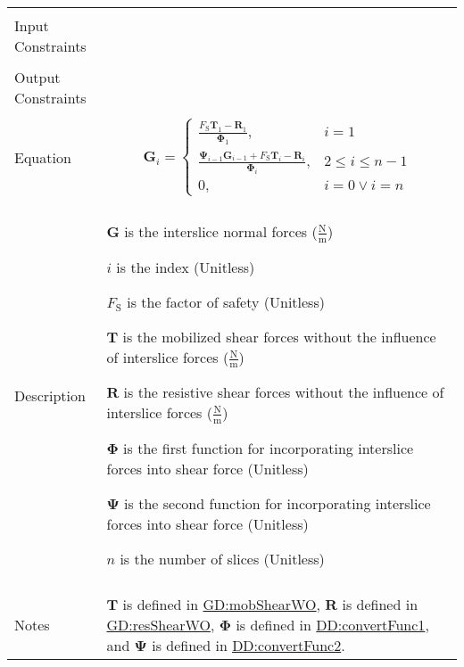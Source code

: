 \documentclass[12pt]{article}
\begin{document}
\begin{minipage}{\textwidth}
\begin{tabular}{>{\raggedright}p{}>{\raggedright\arraybackslash}p{}}
\\ \midrule \\
Input Constraints & 
\\ \midrule \\
Output Constraints & 
\\ \midrule \\
Equation & \begin{displaymath}
           {\symbf{G}}_{i}=\begin{cases}
                           \frac{{F_{\text{S}}} {\symbf{T}}_{1}-{\symbf{R}}_{1}}{{\symbf{Φ}}_{1}}, & i=1\\
                           \frac{{\symbf{Ψ}}_{i-1} {\symbf{G}}_{i-1}+{F_{\text{S}}} {\symbf{T}}_{i}-{\symbf{R}}_{i}}{{\symbf{Φ}}_{i}}, & 2\leq{}i\leq{}n-1\\
                           0, & i=0\lor{}i=n
                           \end{cases}
           \end{displaymath}
\\ \midrule \\
Description & \begin{symbDescription}
              \item{$\symbf{G}$ is the interslice normal forces ($\frac{\text{N}}{\text{m}}$)}
              \item{$i$ is the index (Unitless)}
              \item{${F_{\text{S}}}$ is the factor of safety (Unitless)}
              \item{$\symbf{T}$ is the mobilized shear forces without the influence of interslice forces ($\frac{\text{N}}{\text{m}}$)}
              \item{$\symbf{R}$ is the resistive shear forces without the influence of interslice forces ($\frac{\text{N}}{\text{m}}$)}
              \item{$\symbf{Φ}$ is the first function for incorporating interslice forces into shear force (Unitless)}
              \item{$\symbf{Ψ}$ is the second function for incorporating interslice forces into shear force (Unitless)}
              \item{$n$ is the number of slices (Unitless)}
              \end{symbDescription}
\\ \midrule \\
Notes & $\symbf{T}$ is defined in \hyperref[GD:mobShearWO]{GD:mobShearWO}, $\symbf{R}$ is defined in \hyperref[GD:resShearWO]{GD:resShearWO}, $\symbf{Φ}$ is defined in \hyperref[DD:convertFunc1]{DD:convertFunc1}, and $\symbf{Ψ}$ is defined in \hyperref[DD:convertFunc2]{DD:convertFunc2}.
        

\end{tabular}
\end{minipage}
\end{document}
